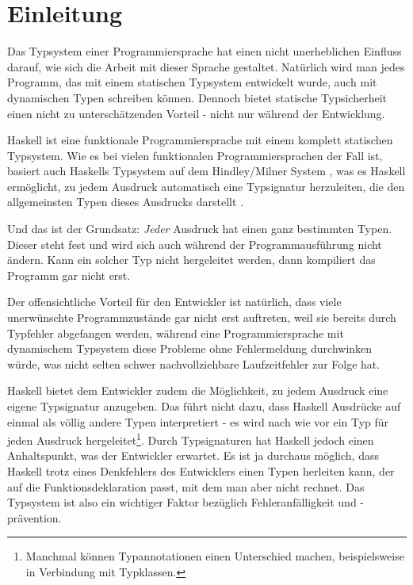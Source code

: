 \section{Einleitung}

\label{sec:einleitung}

Das Typsystem einer Programmiersprache hat einen nicht unerheblichen Einfluss darauf, wie sich die Arbeit mit dieser
Sprache gestaltet. Natürlich wird man jedes Programm, das mit einem statischen Typsystem entwickelt wurde,
auch mit dynamischen Typen schreiben können. Dennoch bietet statische Typsicherheit einen nicht zu unterschätzenden Vorteil -
nicht nur während der Entwicklung.

Haskell ist eine funktionale Programmiersprache mit einem komplett statischen Typ\-sys\-tem. Wie es bei vielen funktionalen
Programmiersprachen der Fall ist, basiert auch Haskells Typsystem auf dem Hindley/Milner System \cite{hindley, milner, damas}, was es
Haskell ermöglicht, zu jedem Ausdruck automatisch eine Typsignatur herzuleiten, die den allgemeinsten Typen dieses Ausdrucks
darstellt \cite{wadler}.

Und das ist der Grundsatz: \textit{Jeder} Ausdruck hat einen ganz bestimmten Typen. Dieser steht fest und wird sich auch während der Programmausführung
nicht ändern. Kann ein solcher Typ nicht hergeleitet werden, dann kompiliert das Programm gar nicht erst.

Der offensichtliche Vorteil für den Entwickler ist natürlich, dass viele unerwünschte Programmzustände gar nicht erst auftreten,
weil sie bereits durch Typfehler abgefangen werden, während eine Programmiersprache mit dynamischem Typsystem diese
Probleme ohne Fehlermeldung durchwinken würde, was nicht selten schwer nachvollziehbare Laufzeitfehler zur Folge hat.

Haskell bietet dem Entwickler zudem die Möglichkeit, zu jedem Ausdruck eine eigene Typsignatur anzugeben. Das führt nicht dazu,
dass Haskell Ausdrücke auf einmal als völlig andere Typen interpretiert - es wird nach wie vor ein Typ für jeden Ausdruck
hergeleitet\footnote{Manchmal können Typannotationen einen Unterschied machen, beispielsweise in Verbindung mit Typklassen.}.
Durch Typsignaturen hat Haskell jedoch einen Anhaltspunkt, was der Entwickler erwartet. Es ist ja durchaus
möglich, dass Haskell trotz eines Denkfehlers des Entwicklers einen Typen herleiten kann, der auf die Funk\-tions\-de\-kla\-rati\-on passt, mit dem man aber nicht rechnet.
Das Typsystem ist also ein wichtiger Faktor bezüglich Fehleranfälligkeit und -prävention.

